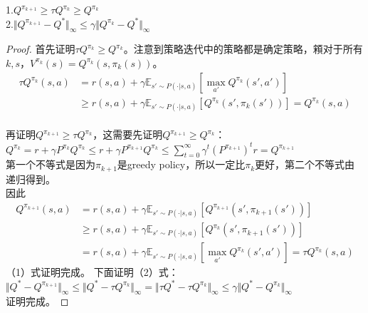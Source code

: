 \begin{lemma}
    1.$Q^{\pi_{k+1}}\geq \tau Q^{\pi_k}\geq Q^{\pi_k}$\\
    2.$\Vert Q^{\pi_{k+1}}-Q^* \Vert_\infty\leq\gamma\Vert Q^{\pi_k}-Q^* \Vert_\infty$
\end{lemma}
\begin{proof}
    首先证明$\tau Q^{\pi_k}\geq Q^{\pi_k}$。注意到策略迭代中的策略都是确定策略，䫅对于所有$k,s$，$V^{\pi_k}(s)=Q^{\pi_k}(s,\pi_k(s))$。\\
    \begin{equation}
        \begin{aligned}
            \tau Q^{\pi_k}(s,a)&=r(s,a)+\gamma \mathbb{E}_{s'\sim P(\cdot |s,a)}[\underset{a'}{\max}Q^{\pi_k}(s',a')]\\
            &\geq r(s,a)+\gamma\mathbb{E}_{s'\sim P(\cdot |s,a)}[Q^{\pi_k}(s',\pi_k(s'))]=Q^{\pi_k}(s,a)
        \end{aligned}
    \end{equation}
    \\再证明$Q^{\pi_{k+1}}\geq \tau Q^{\pi_k}$，这需要先证明$Q^{\pi_{k+1}}\geq Q^{\pi_k}$：\\
    $Q^{\pi_k}=r+\gamma P^{\pi_k}Q^{\pi_k}\leq r+\gamma P^{\pi_{k+1}}Q^{\pi_k}\leq \sum_{t=0}^{\infty}\gamma^t(P^{\pi_{k+1}})^tr=Q^{\pi_{k+1}}$\\
    第一个不等式是因为$\pi_{k+1}$是greedy policy，所以一定比$\pi_{k}$更好，第二个不等式由递归得到。\\因此
    \begin{equation}
        \begin{aligned}
            Q^{\pi_{k+1}}(s,a)&=r(s,a)+\gamma \mathbb{E}_{s'\sim P(\cdot |s,a)}[Q^{\pi_{k+1}}(s',\pi_{k+1}(s'))]\\
            &\geq r(s,a)+\gamma \mathbb{E}_{s'\sim P(\cdot |s,a)}[Q^{\pi_{k}}(s',\pi_{k+1}(s'))]\\
            &=r(s,a)+\gamma \mathbb{E}_{s'\sim P(\cdot |s,a)}[\underset{a'}{\max}Q^{\pi_k}(s',a')]=\tau Q^{\pi_k}(s,a)
        \end{aligned}
    \end{equation}
    （1）式证明完成。
    下面证明（2）式：\\
    $\Vert Q^*-Q^{\pi_{k+1}} \Vert_\infty\leq\Vert Q^*-\tau Q^{\pi_{k}} \Vert_\infty =\Vert \tau Q^*-\tau Q^{\pi_{k}} \Vert_\infty\leq\gamma\Vert Q^*-Q^{\pi_k} \Vert_\infty$\\
    证明完成。
\end{proof}

